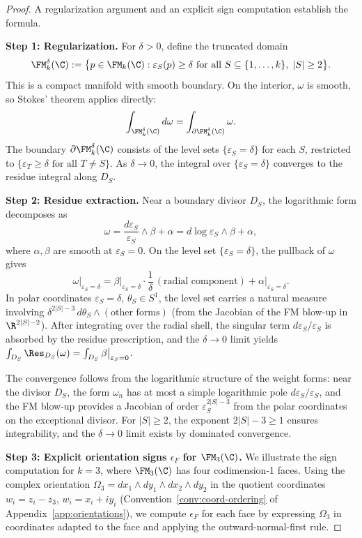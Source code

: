 \begin{proof}
A regularization argument and an explicit sign computation establish the formula.

\textbf{Step 1: Regularization.}
For $\delta > 0$, define the truncated domain
\[
\FM_k^\delta(\C) := \bigl\{ p \in \FM_k(\C) : \varepsilon_S(p) \geq \delta \text{ for all } S \subseteq \{1,\ldots,k\},\; |S| \geq 2 \bigr\}.
\]
This is a compact manifold with smooth boundary. On the interior, $\omega$ is smooth, so Stokes' theorem applies directly:
\[
\int_{\FM_k^\delta(\C)} d\omega = \int_{\partial \FM_k^\delta(\C)} \omega.
\]
The boundary $\partial \FM_k^\delta(\C)$ consists of the level sets $\{\varepsilon_S = \delta\}$ for each $S$, restricted to $\{\varepsilon_T \geq \delta \text{ for all } T \neq S\}$. As $\delta \to 0$, the integral over $\{\varepsilon_S = \delta\}$ converges to the residue integral along $D_S$.

\textbf{Step 2: Residue extraction.}
Near a boundary divisor $D_S$, the logarithmic form decomposes as
\[
\omega = \frac{d\varepsilon_S}{\varepsilon_S} \wedge \beta + \alpha = d\log\varepsilon_S \wedge \beta + \alpha,
\]
where $\alpha, \beta$ are smooth at $\varepsilon_S = 0$. On the level set $\{\varepsilon_S = \delta\}$, the pullback of $\omega$ gives
\[
\omega\big|_{\varepsilon_S = \delta} = \beta\big|_{\varepsilon_S = \delta} \cdot \frac{1}{\delta}\, (\text{radial component}) + \alpha\big|_{\varepsilon_S = \delta}.
\]
In polar coordinates $\varepsilon_S = \delta$, $\theta_S \in S^1$, the level set carries a natural measure involving $\delta^{2|S|-3}\,d\theta_S \wedge (\text{other forms})$ (from the Jacobian of the FM blow-up in $\R^{2|S|-2}$). After integrating over the radial shell, the singular term $d\varepsilon_S / \varepsilon_S$ is absorbed by the residue prescription, and the $\delta \to 0$ limit yields $\int_{D_S} \Res_{D_S}(\omega) = \int_{D_S} \beta\big|_{\varepsilon_S = 0}$.

The convergence follows from the logarithmic structure of the weight forms: near the divisor $D_S$, the form $\omega_n$ has at most a simple logarithmic pole $d\varepsilon_S/\varepsilon_S$, and the FM blow-up provides a Jacobian of order $\varepsilon_S^{2|S|-3}$ from the polar coordinates on the exceptional divisor. For $|S| \ge 2$, the exponent $2|S|-3 \ge 1$ ensures integrability, and the $\delta \to 0$ limit exists by dominated convergence.

\textbf{Step 3: Explicit orientation signs $\epsilon_F$ for $\FM_3(\C)$.}
We illustrate the sign computation for $k = 3$, where $\FM_3(\C)$ has four codimension-1 faces. Using the complex orientation $\Omega_3 = dx_1 \wedge dy_1 \wedge dx_2 \wedge dy_2$ in the quotient coordinates $w_i = z_i - z_3$, $w_i = x_i + iy_i$ (Convention~\ref{conv:coord-ordering} of Appendix~\ref{app:orientations}), we compute $\epsilon_F$ for each face by expressing $\Omega_3$ in coordinates adapted to the face and applying the outward-normal-first rule.


\end{proof}
